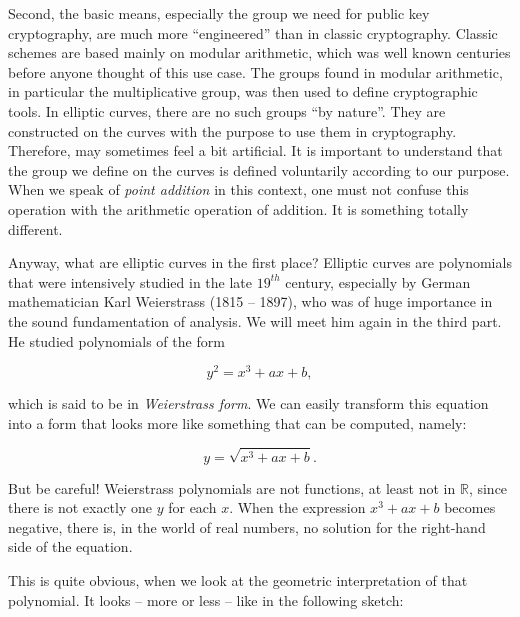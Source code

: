 \documentclass[tikz]{scrreprt}
\begin{document}
Second, the basic means, especially the group
we need for public key cryptography, are
much more ``engineered'' than in classic
cryptography. Classic schemes are based
mainly on modular arithmetic, which was
well known centuries before anyone thought
of this use case. The groups found in modular
arithmetic, in particular the multiplicative
group, was then used to define cryptographic tools.
In elliptic curves, there are no such groups
``by nature''. They are constructed on the
curves with the purpose to use them in cryptography.
Therefore,  may sometimes feel a bit
artificial. It is important to understand that
the group we define on the curves is defined
voluntarily according to our purpose.
When we speak of \emph{point addition} in this
context, one must not confuse this operation
with the arithmetic operation of addition.
It is something totally different.

Anyway, what are elliptic curves in the first place?
Elliptic curves are polynomials that were
intensively studied in the late $19^{th}$ century,
especially by German mathematician Karl Weierstrass (1815 -- 1897),
who was of huge importance in the sound fundamentation
of analysis. We will meet him again in the third part.
He studied polynomials of the form

\begin{equation}
  y^2 = x^3 + ax + b,
\end{equation}

which is said to be in \emph{Weierstrass form}.
We can easily transform this equation
into a form that looks more like something that
can be computed, namely:

\begin{equation}
  y = \sqrt{x^3 + ax + b}.
\end{equation}

But be careful! Weierstrass polynomials are not functions,
at least not in $\mathbb{R}$, since there is not exactly
one $y$ for each $x$. When the expression $x^3 + ax + b$
becomes negative, there is, in the world of real numbers, 
no solution for the right-hand side of the equation.

This is quite obvious, when we look at the geometric
interpretation of that polynomial. It looks -- more or less --
like in the following sketch:

\begin{center}
\end{center}
\end{document}
